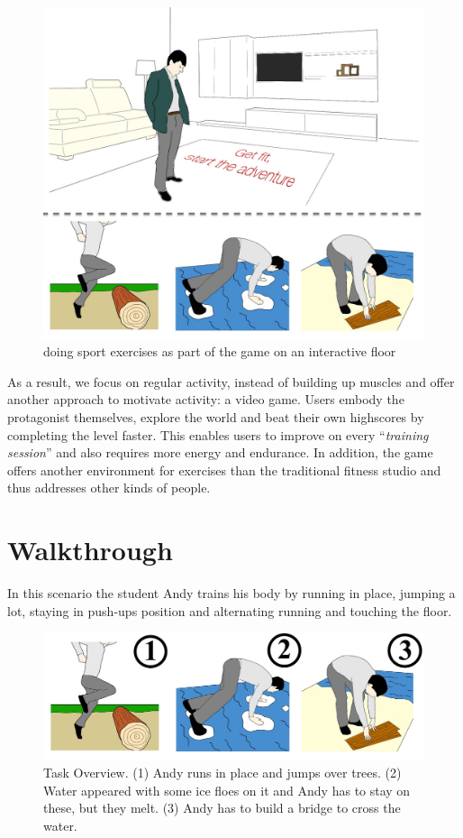 \documentclass{sigchi}
\begin{document}
  \begin{figure}[!t]
    \centering
    \includegraphics[width=\columnwidth]{roto_main_2}
    \caption{doing sport exercises as part of the game on an interactive floor}
    \label{fig:figure1}
  \end{figure}

    As a result, we focus on regular activity, instead of building up muscles and offer another approach to motivate activity: a video game. Users embody the protagonist themselves, explore the world and beat their own highscores by completing the level faster. This enables users to improve on every ``\emph{training session}'' and also requires more energy and endurance. In addition, the game offers another environment for exercises than the traditional fitness studio and thus addresses other kinds of people.


\section{Walkthrough}

  In this scenario the student Andy trains his body by running in place, jumping a lot, staying in push-ups position and alternating running and touching the floor.

  \begin{figure}[!htb]
    \includegraphics[width=\linewidth]{Image_11.jpg}
  \endminipage\hfill
    \caption{Task Overview. (1) Andy runs in place and jumps over trees. (2) Water appeared  with some ice floes on it and Andy has to stay on these, but they melt. (3) Andy has to build a bridge to cross the water.}\label{fig:awesome_image3}
  \end{figure}
\end{document}
